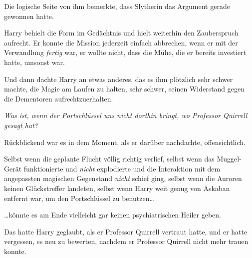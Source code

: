 Die logische Seite von ihm bemerkte, dass Slytherin das Argument gerade gewonnen hatte.

Harry behielt die Form im Gedächtnis und hielt weiterhin den Zauberspruch aufrecht. Er konnte die Mission jederzeit einfach abbrechen, wenn er mit der Verwandlung \emph{fertig} war, er wollte nicht, dass die Mühe, die er bereits investiert hatte, umsonst war.

Und dann dachte Harry an etwas anderes, das es ihm plötzlich sehr schwer machte, die Magie am Laufen zu halten, sehr schwer, seinen Widerstand gegen die Dementoren aufrechtzuerhalten.

\emph{Was ist, wenn der Portschlüssel uns nicht dorthin bringt, wo Professor Quirrell gesagt hat?}

Rückblickend war es in dem Moment, als er darüber nachdachte, offensichtlich.

Selbst wenn die geplante Flucht völlig richtig verlief, selbst wenn das Muggel-Gerät funktionierte und \emph{nicht} explodierte und die Interaktion mit dem angepassten magischen Gegenstand \emph{nicht} schief ging, selbst wenn die Auroren keinen Glückstreffer landeten, selbst wenn Harry weit genug von Askaban entfernt war, um den Portschlüssel zu benutzen…

…könnte es am Ende vielleicht gar keinen psychiatrischen Heiler geben.

Das hatte Harry geglaubt, als er Professor Quirrell vertraut hatte, und er hatte vergessen, es neu zu bewerten, nachdem er Professor Quirrell nicht mehr trauen konnte.

